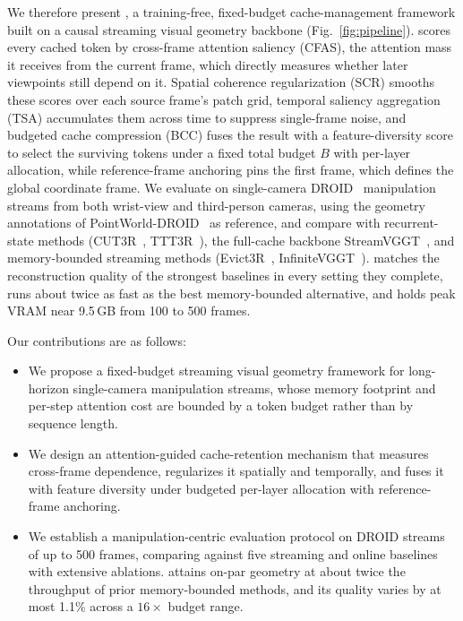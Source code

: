 We therefore present \method{}, a training-free, fixed-budget cache-management framework built on a causal streaming visual geometry backbone (Fig.~\ref{fig:pipeline}). \method{} scores every cached token by cross-frame attention saliency (CFAS), the attention mass it receives from the current frame, which directly measures whether later viewpoints still depend on it. Spatial coherence regularization (SCR) smooths these scores over each source frame's patch grid, temporal saliency aggregation (TSA) accumulates them across time to suppress single-frame noise, and budgeted cache compression (BCC) fuses the result with a feature-diversity score to select the surviving tokens under a fixed total budget $B$ with per-layer allocation, while reference-frame anchoring pins the first frame, which defines the global coordinate frame. We evaluate on single-camera DROID~\cite{khazatsky2024droid} manipulation streams from both wrist-view and third-person cameras, using the geometry annotations of PointWorld-DROID~\cite{huang2026pointworld} as reference, and compare with recurrent-state methods (CUT3R~\cite{wang2025cut3r}, TTT3R~\cite{chen2025ttt3r}), the full-cache backbone StreamVGGT~\cite{zhuo2025streamvggt}, and memory-bounded streaming methods (Evict3R~\cite{mahdi2025evict3r}, InfiniteVGGT~\cite{yuan2026infinitevggt}). \method{} matches the reconstruction quality of the strongest baselines in every setting they complete, runs about twice as fast as the best memory-bounded alternative, and holds peak VRAM near 9.5\,GB from 100 to 500 frames.

Our contributions are as follows:
\begin{itemize}
\item We propose a fixed-budget streaming visual geometry framework for long-horizon single-camera manipulation streams, whose memory footprint and per-step attention cost are bounded by a token budget rather than by sequence length.
\item We design an attention-guided cache-retention mechanism that measures cross-frame dependence, regularizes it spatially and temporally, and fuses it with feature diversity under budgeted per-layer allocation with reference-frame anchoring.
\item We establish a manipulation-centric evaluation protocol on DROID streams of up to 500 frames, comparing against five streaming and online baselines with extensive ablations. \method{} attains on-par geometry at about twice the throughput of prior memory-bounded methods, and its quality varies by at most 1.1\% across a $16\times$ budget range.
\end{itemize}
